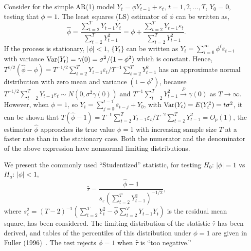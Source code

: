 Consider for the simple AR(1) model $Y_t = \phi Y_{t-1} + \varepsilon_t$, $t = 1,2, \ldots, T$, $Y_0 = 0$, testing that $\phi = 1$. The least squares (LS) estimator of $\phi$ can be written as,
	\begin{equation} \label{eqn:futurereffirst}
	\hat{\phi} = \dfrac{\sum_{t=2}^T Y_{t-1}Y_t}{\sum_{t=2}^T Y_{t-1}^2} = \phi + \dfrac{\sum_{t=2}^T Y_{t-1}\varepsilon_t}{\sum_{t=2}^T Y_{t-1}^2}.
	\end{equation}
If the process is stationary, $\lvert \phi \rvert< 1$, $\{ Y_t \}$ can be written as $Y_t = \sum_{i=0}^\infty \phi^i \varepsilon_{t-i}$ with variance $\operatorname{Var}(Y_t) = \gamma(0) = \sigma^2/(1-\phi^2)$ which is constant. Hence, $T^{1/2}(\hat{\phi} - \phi) = T^{-1/2}\sum_{t=2}^T Y_{t-1}\varepsilon_t/T^{-1}\sum_{t=2}^TY_{t-1}^2$ has an approximate normal distribution with zero mean and variance $(1 - \phi^2)$, because $T^{-1/2}\sum_{t=2}^T Y_{t-1} \varepsilon_t \sim N(0,\sigma^2 \gamma(0))$ and $T^{-1} \sum_{t=2}^T Y_{t-1}^2 \xrightarrow{P} \gamma(0)$ as $T \to \infty$. However, when $\phi = 1$, so $Y_t = \sum_{j=0}^{t-1}\varepsilon_{t-j} + Y_0$, with $\operatorname{Var}(Y_t) = E(Y_t^2) = t \sigma^2$, it can be shown that $T(\hat{\phi} - 1) = T^{-1} \sum_{t=2}^T Y_{t-1} \varepsilon_t/T^{-2} \sum_{t=2}^T Y_{t-1}^2 = O_p(1)$, the estimator $\hat{\phi}$ approaches its true value $\phi = 1$ with increasing sample size $T$ at a faster rate than in the stationary case. Both the numerator and the denominator of the above expression have nonnormal limiting distributions. 


We present the commonly used ``Studentized'' statistic, for testing $H_0: \, \lvert \phi \rvert=1$ vs $H_a: \, \lvert \phi \rvert < 1$,
	\begin{equation} \label{eqn:hattaunew}
	\hat{\tau} = \dfrac{\hat{\phi} - 1}{s_{\varepsilon} \left( \sum_{t=2}^T Y_{t-1}^2 \right)^{-1/2}},
	\end{equation}
where $s_\varepsilon^2 = (T - 2)^{-1} (\sum_{t=2}^T Y_t^2 - \hat{\phi} \sum_{t=2}^T Y_{t-1} Y_t)$ is the residual mean square, has been considered. The limiting distribution of the statistic $\hat{\tau}$ has been derived, and tables of the percentiles of this distribution under $\phi = 1$ are given in Fuller (1996)~\cite{fuller1996}. The test rejects $\phi = 1$ when $\hat{\tau}$ is ``too negative.''


